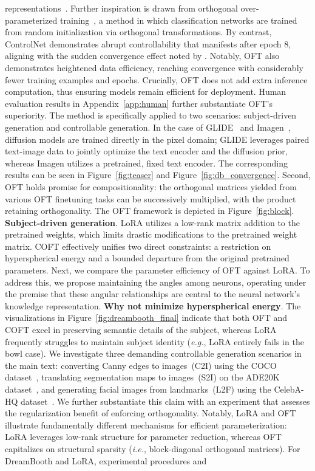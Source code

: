 representations~\cite{su2020vlbert,lu2019vilbert,radford2021learning,wang2021simvlm,li2022blip,li2023blip,alayrac2022flamingo,schuhmann2022laion}. Further inspiration is drawn from orthogonal over-parameterized training~\cite{liu2021orthogonal}, a method in which classification networks are trained from random initialization via orthogonal transformations. By contrast, ControlNet demonstrates abrupt controllability that manifests after epoch 8, aligning with the sudden convergence effect noted by \cite{zhang2023adding}. Notably, OFT also demonstrates heightened data efficiency, reaching convergence with considerably fewer training examples and epochs. Crucially, OFT does not add extra inference computation, thus ensuring models remain efficient for deployment. Human evaluation results in Appendix~\ref{app:human} further substantiate OFT’s superiority. The method is specifically applied to two scenarios: subject-driven generation and controllable generation. In the case of GLIDE~\cite{nichol2022glide} and Imagen~\cite{saharia2022photorealistic}, diffusion models are trained directly in the pixel domain; GLIDE leverages paired text-image data to jointly optimize the text encoder and the diffusion prior, whereas Imagen utilizes a pretrained, fixed text encoder. The corresponding results can be seen in Figure~\ref{fig:teaser} and Figure~\ref{fig:db_convergence}. Second, OFT holds promise for compositionality: the orthogonal matrices yielded from various OFT finetuning tasks can be successively multiplied, with the product retaining orthogonality. The OFT framework is depicted in Figure~\ref{fig:block}. \textbf{Subject-driven generation}. LoRA utilizes a low-rank matrix addition to the pretrained weights, which limits drastic modifications to the pretrained weight matrix. COFT effectively unifies two direct constraints: a restriction on hyperspherical energy and a bounded departure from the original pretrained parameters. Next, we compare the parameter efficiency of OFT against LoRA. To address this, we propose maintaining the angles among neurons, operating under the premise that these angular relationships are central to the neural network’s knowledge representation. \textbf{Why not minimize hyperspherical energy}. The visualizations in Figure~\ref{fig:dreambooth_final} indicate that both OFT and COFT excel in preserving semantic details of the subject, whereas LoRA frequently struggles to maintain subject identity (\emph{e.g.}, LoRA entirely fails in the bowl case). We investigate three demanding controllable generation scenarios in the main text: converting Canny edges to images~(C2I) using the COCO dataset~\cite{lin2014microsoft}, translating segmentation maps to images~(S2I) on the ADE20K dataset~\cite{zhou2017scene}, and generating facial images from landmarks~(L2F) using the CelebA-HQ dataset~\cite{karras2018progressive,xia2021tedigan}. We further substantiate this claim with an experiment that assesses the regularization benefit of enforcing orthogonality. Notably, LoRA and OFT illustrate fundamentally different mechanisms for efficient parameterization: LoRA leverages low-rank structure for parameter reduction, whereas OFT capitalizes on structural sparsity (\emph{i.e.}, block-diagonal orthogonal matrices). For DreamBooth and LoRA, experimental procedures and 